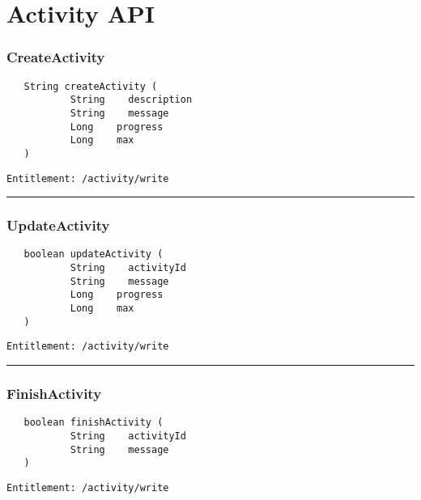 \chapter{Activity API}

\subsection{CreateActivity}
\label{Api:CreateActivity}
\begin{verbatim}
   String createActivity (
           String    description
           String    message
           Long    progress
           Long    max
   )
\end{verbatim}
\begin{Verbatim}[fontsize=\small, formatcom=\color{Maroon}]
  Entitlement: /activity/write
\end{Verbatim}



\rule{12cm}{2pt}
\subsection{UpdateActivity}
\label{Api:UpdateActivity}
\begin{verbatim}
   boolean updateActivity (
           String    activityId
           String    message
           Long    progress
           Long    max
   )
\end{verbatim}
\begin{Verbatim}[fontsize=\small, formatcom=\color{Maroon}]
  Entitlement: /activity/write
\end{Verbatim}



\rule{12cm}{2pt}
\subsection{FinishActivity}
\label{Api:FinishActivity}
\begin{verbatim}
   boolean finishActivity (
           String    activityId
           String    message
   )
\end{verbatim}
\begin{Verbatim}[fontsize=\small, formatcom=\color{Maroon}]
  Entitlement: /activity/write
\end{Verbatim}



